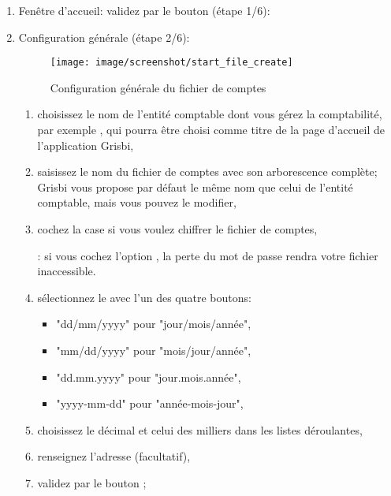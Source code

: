 \begin{enumerate}
	\item Fenêtre d'accueil: validez par le bouton  (étape 1/6):
	\item Configuration
 générale (étape 2/6):

		\begin{figure}[htbp]
		\begin{center}
		\texttt{[image: image/screenshot/start\_file\_create]}
		\end{center}
		\caption{Configuration générale du fichier de comptes}
		\label{start-file-create}
		\end{figure}
		
		\begin{enumerate} 
		 	\item choisissez le nom de l'entité comptable dont vous gérez la comptabilité, par exemple , qui pourra être choisi comme titre de la page d'accueil de l'application Grisbi,
			\item saisissez le nom du fichier de comptes avec son arborescence complète; Grisbi vous propose par défaut le même nom que celui de l'entité comptable, mais vous pouvez le modifier,
			\item cochez la case  si vous voulez \gls{chiffrer} le fichier de comptes,
			
			\textcolor{red}{}: si vous cochez l'option , la perte du mot de passe rendra votre fichier inaccessible.
			
			\item sélectionnez le  avec l'un des quatre boutons:
				\begin{itemize}	
				\item[\textopenbullet] "dd/mm/yyyy" pour "jour/mois/année",
				\item[\textopenbullet] "mm/dd/yyyy" pour "mois/jour/année",
				\item[\textopenbullet] "dd.mm.yyyy" pour "jour.mois.année",
				\item[\textopenbullet] "yyyy-mm-dd" pour "année-mois-jour",
				\end{itemize}
			\item choisissez le  décimal et celui des milliers dans les listes déroulantes,
			 \item renseignez l'adresse (facultatif),
			 \item validez par le bouton ;
		\end{enumerate}
		

\end{enumerate}
